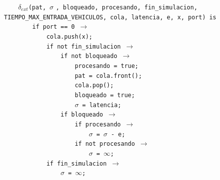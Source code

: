 \documentclass[12pt]{article}
\begin{document}
\begin{tcolorbox}[
    colback=black!5!white,
    colframe=black!80!white,
    boxrule=0.8pt,
    arc=2pt,
    left=5pt,
    right=5pt,
    top=5pt,
    bottom=5pt,
    fontupper=\ttfamily,
    breakable
]
\begin{flushleft}
\texttt{~~~~}$\delta_{ext}$\texttt{(pat, }$\sigma$ \texttt{, bloqueado, procesando, fin\_simulacion, TIEMPO\_MAX\_ENTRADA\_VEHICULOS, cola, latencia, e, x, port) is}\\
\texttt{~~~~~~~~if port == 0 }\(\rightarrow\)\\
\texttt{~~~~~~~~~~~~cola.push(x);}\\
\texttt{~~~~~~~~~~~~if not fin\_simulacion }\(\rightarrow\)\\
\texttt{~~~~~~~~~~~~~~~~if not bloqueado }\(\rightarrow\)\\
\texttt{~~~~~~~~~~~~~~~~~~~~procesando = true;}\\
\texttt{~~~~~~~~~~~~~~~~~~~~pat = cola.front();}\\
\texttt{~~~~~~~~~~~~~~~~~~~~cola.pop();}\\
\texttt{~~~~~~~~~~~~~~~~~~~~bloqueado = true;}\\
\texttt{~~~~~~~~~~~~~~~~~~~~}$\sigma$\texttt{ = latencia;}\\
\texttt{~~~~~~~~~~~~~~~~if bloqueado }\(\rightarrow\)\\
\texttt{~~~~~~~~~~~~~~~~~~~~if procesando }\(\rightarrow\)\\
\texttt{~~~~~~~~~~~~~~~~~~~~~~~~}$\sigma$\texttt{ = }$\sigma$\texttt{ - e;}\\
\texttt{~~~~~~~~~~~~~~~~~~~~if not procesando }\(\rightarrow\)\\
\texttt{~~~~~~~~~~~~~~~~~~~~~~~~}$\sigma$\texttt{ = }\(\infty\)\texttt{;}\\
\texttt{~~~~~~~~~~~~if fin\_simulacion }\(\rightarrow\)\\
\texttt{~~~~~~~~~~~~~~~~}$\sigma$\texttt{ = }\(\infty\)\texttt{;}\\[5pt]


\end{flushleft}
\end{tcolorbox}
\end{document}
